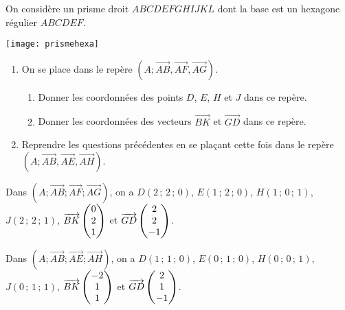 \documentclass[11pt,fleqn, openany]{book} %
\begin{document}
\begin{exercise}[topic=geo03]
On considère un prisme droit $ABCDEFGHIJKL$ dont la base est un hexagone régulier $ABCDEF$. 

\begin{minipage}{0.3\linewidth}
 \begin{center}
\texttt{[image: prismehexa]}
\end{center}
\end{minipage}\hfill\begin{minipage}{0.68\linewidth}

\begin{enumerate}
\item On se place dans le repère $(A; \overrightarrow{AB}, \overrightarrow{AF},\overrightarrow{AG})$.
\begin{enumerate}
\item Donner les coordonnées des points $D$, $E$, $H$ et $J$ dans ce repère.
\item Donner les coordonnées des vecteurs $\overrightarrow{BK}$ et $\overrightarrow{GD}$ dans ce repère. 
\end{enumerate}
\item Reprendre les questions précédentes en se plaçant cette fois dans le repère $(A; \overrightarrow{AB}, \overrightarrow{AE},\overrightarrow{AH})$.
\end{enumerate}\end{minipage}

\end{exercise}

\begin{solution}
Dans \((A;\overrightarrow{AB};\overrightarrow{AF};\overrightarrow{AG})\), on a \(D(2\,;\,2\,;\,0)\), \(E(1\,;\,2\,;\,0)\), \(H(1\,;\,0\,;\,1)\), \(J(2\,;\,2\,;\,1)\), \(\overrightarrow{BK}\renewcommand{\arraystretch}{1}\renewcommand{\arraystretch}{1}\begin{pmatrix}0 \\ 2 \\ 1 \end{pmatrix}\) et \(\overrightarrow{GD}\renewcommand{\arraystretch}{1}\renewcommand{\arraystretch}{1}\begin{pmatrix}2 \\ 2 \\ -1\end{pmatrix}\). 

Dans \((A;\overrightarrow{AB};\overrightarrow{AE};\overrightarrow{AH})\), on a \(D(1\,;\,1\,;\,0)\), \(E(0\,;\,1\,;\,0)\), \(H(0\,;\,0\,;\,1)\), \(J(0\,;\,1\,;\,1)\), \(\overrightarrow{BK}\renewcommand{\arraystretch}{1}\renewcommand{\arraystretch}{1}\begin{pmatrix}-2 \\ 1 \\ 1 \end{pmatrix}\) et \(\overrightarrow{GD}\renewcommand{\arraystretch}{1}\renewcommand{\arraystretch}{1}\begin{pmatrix}2 \\ 1 \\ -1\end{pmatrix}\).
\end{solution}
\end{document}
